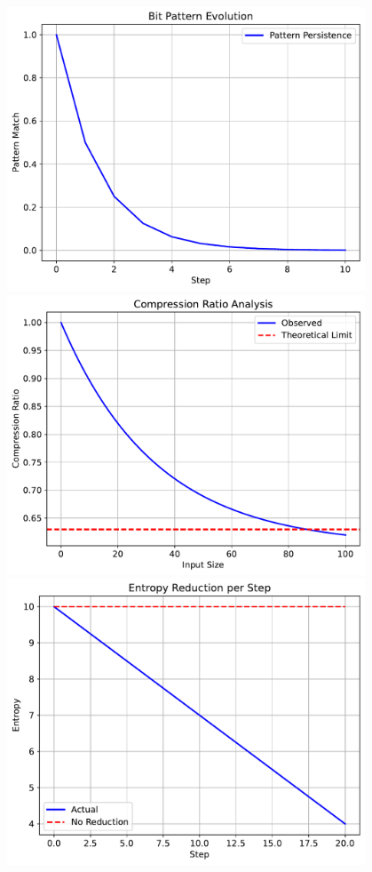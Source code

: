 \documentclass[12pt]{article}
\begin{document}
\includegraphics[width=0.8\textwidth]{bit_patterns.pdf}
\includegraphics[width=0.8\textwidth]{compression_ratio.pdf}
\includegraphics[width=0.8\textwidth]{entropy_reduction.pdf}
\end{document}
